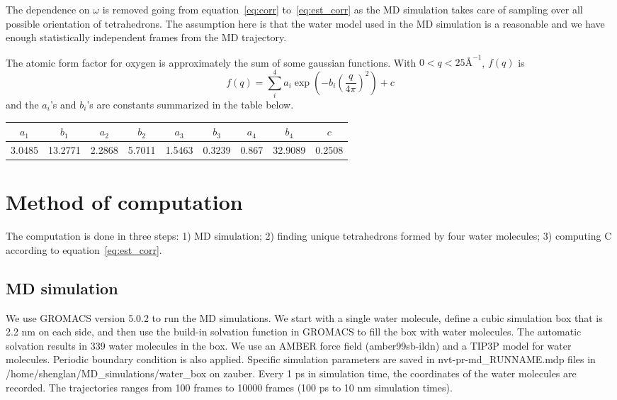 \documentclass[20pt]{article}
\begin{document}
The dependence on $\omega$ is removed going from equation~\ref{eq:corr} to~\ref{eq:est_corr} as the MD simulation takes care of sampling over all possible orientation of tetrahedrons. The assumption here is that the water model used in the MD simulation is a reasonable and we have enough statistically independent frames from the MD trajectory. 

The atomic form factor for oxygen is approximately the sum of some gaussian functions. With $0 < q < 25 \si{\angstrom} ^{-1}$, $f(q)$ is
\begin{equation} \label{eq:Oform}
f(q) = \sum_{i}^{4} a_i \exp{(-b_i (\frac{q}{4\pi})^2)} + c
\end{equation}
and the $a_i$'s and $b_i$'s are constants summarized in the table below.
\begin{center}
\begin{tabular}{ |c|c|c|c|c|c|c|c|c|} 
 \hline
 $a_1$ & $b_1$ & $a_2$ & $b_2$ &$a_3$ & $b_3$ &$a_4$ & $b_4$ & $c$ \\ 
 \hline
3.0485 & 13.2771 & 2.2868 & 5.7011 & 1.5463 & 0.3239 & 0.867 & 32.9089 & 0.2508 \\ 
 \hline
\end{tabular}
\end{center}

\section{Method of computation}
The computation is done in three steps: 1) MD simulation; 2) finding unique tetrahedrons formed by four water molecules; 3) computing C according to equation~\ref{eq:est_corr}.

\subsection{MD simulation}
We use GROMACS version 5.0.2 to run the MD simulations. We start with a single water molecule, define a cubic simulation box that is 2.2 nm on each side, and then use the build-in solvation function in GROMACS to fill the box with water molecules. The automatic solvation results in 339 water molecules in the box. We use an AMBER force field (amber99sb-ildn) and a TIP3P model for water molecules. Periodic boundary condition is also applied. Specific simulation parameters are saved in nvt-pr-md\_RUNNAME.mdp files in /home/shenglan/MD\_simulations/water\_box on zauber. Every 1 ps in simulation time, the coordinates of the water molecules are recorded. The trajectories ranges from 100 frames to 10000 frames (100 ps to 10 nm simulation times).
\end{document}
